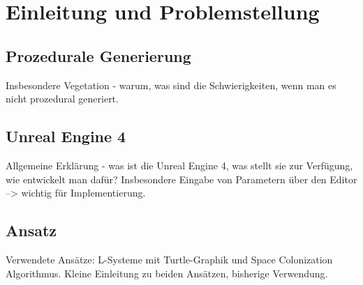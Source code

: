 \chapter{Einleitung und Problemstellung}

\section{Prozedurale Generierung}

Insbesondere Vegetation - warum, was sind die Schwierigkeiten, wenn man es nicht prozedural generiert.

\section{Unreal Engine 4}

Allgemeine Erklärung - was ist die Unreal Engine 4, was stellt sie zur Verfügung, wie entwickelt man dafür? Insbesondere Eingabe von Parametern über den Editor --> wichtig für Implementierung.

\section{Ansatz}
Verwendete Ansätze: L-Systeme mit Turtle-Graphik und Space Colonization Algorithmus. Kleine Einleitung zu beiden Ansätzen, bisherige Verwendung.